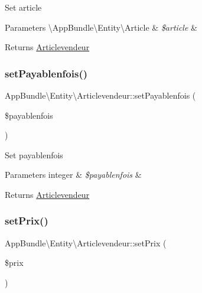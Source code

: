 Set article


\begin{DoxyParams}[1]{Parameters}
\textbackslash{}\+App\+Bundle\textbackslash{}\+Entity\textbackslash{}\+Article & {\em \$article} & \\
\hline
\end{DoxyParams}
\begin{DoxyReturn}{Returns}
\hyperlink{class_app_bundle_1_1_entity_1_1_articlevendeur}{Articlevendeur} 
\end{DoxyReturn}
\mbox{\label{class_app_bundle_1_1_entity_1_1_articlevendeur_a7218d0ec1c75aced2fe278601b0cdbfe}} 
\subsubsection{\texorpdfstring{set\+Payablenfois()}{setPayablenfois()}}
{\footnotesize\ttfamily App\+Bundle\textbackslash{}\+Entity\textbackslash{}\+Articlevendeur\+::set\+Payablenfois (\begin{DoxyParamCaption}\item[{}]{\$payablenfois }\end{DoxyParamCaption})}

Set payablenfois


\begin{DoxyParams}[1]{Parameters}
integer & {\em \$payablenfois} & \\
\hline
\end{DoxyParams}
\begin{DoxyReturn}{Returns}
\hyperlink{class_app_bundle_1_1_entity_1_1_articlevendeur}{Articlevendeur} 
\end{DoxyReturn}
\mbox{\label{class_app_bundle_1_1_entity_1_1_articlevendeur_a80741e5d2411b3c5018eadbdd58daaa7}} 
\subsubsection{\texorpdfstring{set\+Prix()}{setPrix()}}
{\footnotesize\ttfamily App\+Bundle\textbackslash{}\+Entity\textbackslash{}\+Articlevendeur\+::set\+Prix (\begin{DoxyParamCaption}\item[{}]{\$prix }\end{DoxyParamCaption})}

